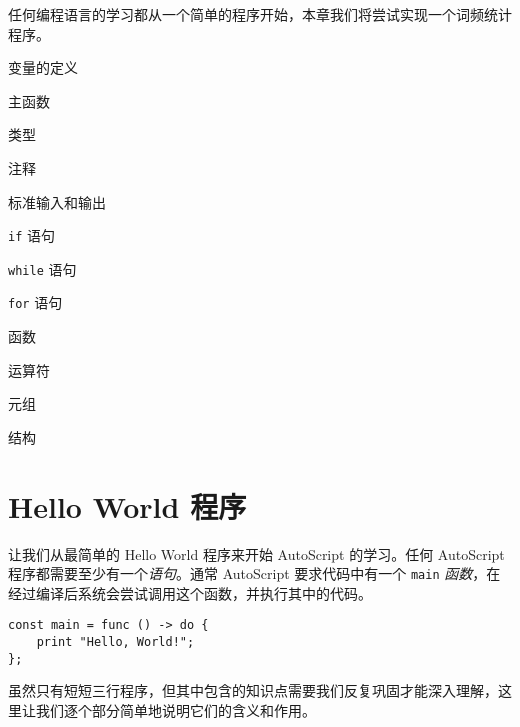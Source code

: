 任何编程语言的学习都从一个简单的程序开始，本章我们将尝试实现一个词频统计程序。

\begin{introduction}
    \item 变量的定义
    \item 主函数
    \item 类型
    \item 注释
    \item 标准输入和输出
    \item \lstinline!if! 语句
    \item \lstinline!while! 语句
    \item \lstinline!for! 语句
    \item 函数
    \item 运算符
    \item 元组
    \item 结构
\end{introduction}

\section{Hello World 程序}

让我们从最简单的 Hello World 程序来开始 AutoScript 的学习。任何 AutoScript 程序都需要至少有一个\emph{语句}。通常 AutoScript 要求代码中有一个 \lstinline!main! \emph{函数}，在经过编译后系统会尝试调用这个函数，并执行其中的代码。

\begin{lstlisting}
const main = func () -> do {
    print "Hello, World!";
};
\end{lstlisting}

虽然只有短短三行程序，但其中包含的知识点需要我们反复巩固才能深入理解，这里让我们逐个部分简单地说明它们的含义和作用。

